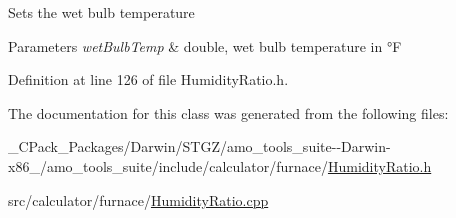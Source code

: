 Sets the wet bulb temperature


\begin{DoxyParams}{Parameters}
{\em wet\+Bulb\+Temp} & double, wet bulb temperature in °F \\
\hline
\end{DoxyParams}


Definition at line 126 of file Humidity\+Ratio.\+h.



The documentation for this class was generated from the following files\+:\begin{DoxyCompactItemize}
\item 
\+\_\+\+C\+Pack\+\_\+\+Packages/\+Darwin/\+S\+T\+G\+Z/amo\+\_\+tools\+\_\+suite-\/-\/\+Darwin-\/x86\+\_/amo\+\_\+tools\+\_\+suite/include/calculator/furnace/\hyperlink{___c_pack___packages_2_darwin_2_s_t_g_z_2amo__tools__suite--_darwin-x86__64_2amo__tools__suite_2d441e7200aa76b63b61e223aa5b41c4c}{Humidity\+Ratio.\+h}\item 
src/calculator/furnace/\hyperlink{_humidity_ratio_8cpp}{Humidity\+Ratio.\+cpp}\end{DoxyCompactItemize}
